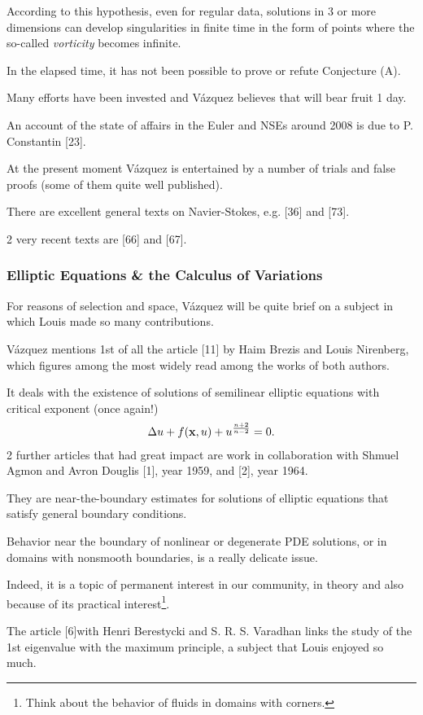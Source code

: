 \documentclass{article}
\begin{document}
According to this hypothesis, even for regular data, solutions in 3 or more dimensions can develop singularities in finite time in the form of points where the so-called \textit{vorticity} becomes infinite.

%
In the elapsed time, it has not been possible to prove or refute Conjecture (A).

Many efforts have been invested and V\'azquez believes that will bear fruit 1 day.

An account of the state of affairs in the Euler and NSEs around 2008 is due to P. Constantin [23].

At the present moment V\'azquez is entertained by a number of trials and false proofs (some of them quite well published).

There are excellent general texts on Navier-Stokes, e.g. [36] and [73].

2 very recent texts are [66] and [67].

\subsubsection{Elliptic Equations \& the Calculus of Variations}
For reasons of selection and space, V\'azquez will be quite brief on a subject in which Louis made so many contributions.

V\'azquez mentions 1st of all the article [11] by Haim Brezis and Louis Nirenberg, which figures among the most widely read among the works of both authors.

It deals with the existence of solutions of semilinear elliptic equations with critical exponent (once again!)
\begin{align*}
	\Delta u + f({\bf x},u) + u^{\frac{n + 2}{n - 2}} = 0.
\end{align*}
2 further articles that had great impact are work in collaboration with Shmuel Agmon and Avron Douglis [1], year 1959, and [2], year 1964.

They are near-the-boundary estimates for solutions of elliptic equations that satisfy general boundary conditions.

Behavior near the boundary of nonlinear or degenerate PDE solutions, or in domains with nonsmooth boundaries, is a really delicate issue.

Indeed, it is a topic of permanent interest in our community, in theory and also because of its practical interest\footnote{Think about the behavior of fluids in domains with corners.}.

%
The article [6]with Henri Berestycki and S. R. S. Varadhan links the study of the 1st eigenvalue with the maximum principle, a subject that Louis enjoyed so much.
\end{document}
